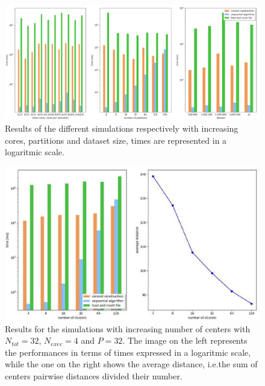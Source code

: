 \documentclass[a4paper, 11pt]{article}
\begin{document}
\egroup
\begin{figure}
	\vspace{0pt}
  \centering
      \includegraphics[scale=0.35]{grafici.png}
  \caption{Results of the different simulations respectively with increasing cores, partitions and dataset size, times are represented in a logaritmic scale.}\label{image:a}

\end{figure}

\begin{figure}

  \centering
      \includegraphics[scale=0.35]{result.jpg}
  \caption{Results for the simulations with increasing number of centers with $N_{tot} = 32$, $N_{exec} = 4$ and $P=32$. The image on the left represents the performances in terms of times expressed in a logaritmic scale, while the one on the right shows the average distance, i.e.the sum of centers pairwise distances divided their number.}\label{image:b}
\end{figure}
\end{document}
